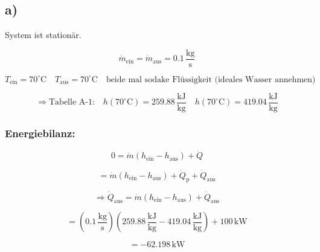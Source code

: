 

\subsection*{a)}
System ist stationär.

\[
\dot{m}_{\text{ein}} = \dot{m}_{\text{aus}} = 0.1 \, \frac{\text{kg}}{\text{s}}
\]

\[
T_{\text{ein}} = 70^\circ \text{C} \quad T_{\text{aus}} = 70^\circ \text{C} \quad \text{beide mal sodake Flüssigkeit (ideales Wasser annehmen)}
\]

\[
\Rightarrow \text{Tabelle A-1:} \quad h(70^\circ \text{C}) = 259.88 \, \frac{\text{kJ}}{\text{kg}} \quad h(70^\circ \text{C}) = 419.04 \, \frac{\text{kJ}}{\text{kg}}
\]

\subsubsection*{Energiebilanz:}

\[
0 = \dot{m} (h_{\text{ein}} - h_{\text{aus}}) + \dot{Q}
\]

\[
= \dot{m} (h_{\text{ein}} - h_{\text{aus}}) + \dot{Q}_{\text{p}} + \dot{Q}_{\text{aus}}
\]

\[
\Rightarrow \dot{Q}_{\text{aus}} = \dot{m} (h_{\text{ein}} - h_{\text{aus}}) + \dot{Q}_{\text{aus}}
\]

\[
= \left( 0.1 \, \frac{\text{kg}}{\text{s}} \right) \left( 259.88 \, \frac{\text{kJ}}{\text{kg}} - 419.04 \, \frac{\text{kJ}}{\text{kg}} \right) + 100 \, \text{kW}
\]

\[
= -62.198 \, \text{kW}
\]